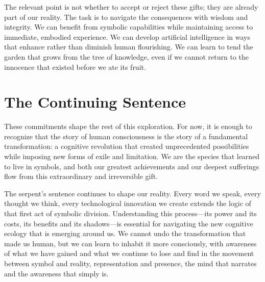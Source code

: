 The relevant point is not whether to accept or reject these gifts; they are already part of our reality. The task is to navigate the consequences with wisdom and integrity. We can benefit from symbolic capabilities while maintaining access to immediate, embodied experience. We can develop artificial intelligence in ways that enhance rather than diminish human flourishing. We can learn to tend the garden that grows from the tree of knowledge, even if we cannot return to the innocence that existed before we ate its fruit.

\section{The Continuing Sentence}

These commitments shape the rest of this exploration. For now, it is enough to recognize that the story of human consciousness is the story of a fundamental transformation: a cognitive revolution that created unprecedented possibilities while imposing new forms of exile and limitation. We are the species that learned to live in symbols, and both our greatest achievements and our deepest sufferings flow from this extraordinary and irreversible gift.

The serpent's sentence continues to shape our reality. Every word we speak, every thought we think, every technological innovation we create extends the logic of that first act of symbolic division. Understanding this process—its power and its costs, its benefits and its shadows—is essential for navigating the new cognitive ecology that is emerging around us. We cannot undo the transformation that made us human, but we can learn to inhabit it more consciously, with awareness of what we have gained and what we continue to lose and find in the movement between symbol and reality, representation and presence, the mind that narrates and the awareness that simply is.
